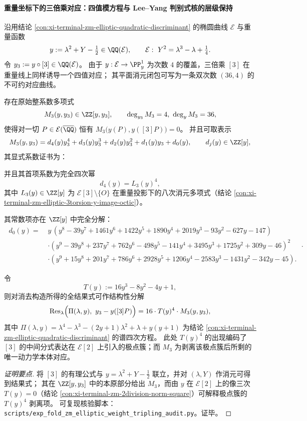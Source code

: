\paragraph{重量坐标下的三倍乘对应：四值模方程与 Lee--Yang 判别式核的层级保持}
沿用结论 \ref{con:xi-terminal-zm-elliptic-quadratic-discriminant} 的椭圆曲线 \(\mathcal{E}\) 与重量函数
\[
y:=\lambda^{2}+Y-\tfrac12\in\QQ(\mathcal{E}),
\qquad
\mathcal{E}:\ Y^{2}=\lambda^{3}-\lambda+\tfrac14.
\]
令 \(y_{3}:=y\circ[3]\in\QQ(\mathcal{E})\)。
由于 \(y:\mathcal{E}\to\PP^{1}_{y}\) 为次数 \(4\) 的覆盖，三倍乘 \([3]\) 在重量线上同样诱导一个四值对应；
其平面消元闭包可写为一条双次数 \((36,4)\) 的不可约对应曲线。

\begin{conclusion}\label{con:xi-terminal-zm-elliptic-weight-tripling-modular-equation}
存在原始整系数多项式
\[
M_{3}(y,y_{3})\in\ZZ[y,y_{3}],
\qquad
\deg_{y_{3}}M_{3}=4,\ \deg_{y}M_{3}=36,
\]
使得对一切 \(P\in\mathcal{E}(\overline{\QQ})\) 恒有 \(M_{3}\bigl(y(P),y([3]P)\bigr)=0\)。
并且可取表示
\[
M_{3}(y,y_{3})=d_{4}(y)y_{3}^{4}+d_{3}(y)y_{3}^{3}+d_{2}(y)y_{3}^{2}+d_{1}(y)y_{3}+d_{0}(y),
\qquad d_{j}(y)\in\ZZ[y],
\]
其显式系数证书为：

\par
并且其首项系数为完全四次幂
\[
d_{4}(y)=L_{3}(y)^{4},
\]
其中 \(L_{3}(y)\in\ZZ[y]\) 为 \(\mathcal{E}[3]\setminus\{O\}\) 在重量投影下的八次消元多项式（结论 \ref{con:xi-terminal-zm-elliptic-3torsion-y-image-octic}）。
\par
其常数项亦在 \(\ZZ[y]\) 中完全分解：
\[
\boxed{\;
\begin{aligned}
d_{0}(y)=\;&y\,(y^{8}-39y^{7}+1461y^{6}+1422y^{5}+1890y^{4}+2019y^{3}-93y^{2}-627y-147)\\
&\cdot (y^{9}-39y^{8}+237y^{7}+762y^{6}-498y^{5}-141y^{4}+3495y^{3}+1725y^{2}+309y-46)^{2}\\
&\cdot (y^{9}+15y^{8}+201y^{7}+786y^{6}+2928y^{5}+1206y^{4}-2583y^{3}-1431y^{2}-342y-45).
\end{aligned}
\; }.
\]
\par
令
\[
T(y):=16y^{3}-8y^{2}-4y+1,
\]
则对消去构造所得的全结果式可作结构性分解
\[
\operatorname{Res}_{\lambda}\Bigl(\Pi(\lambda,y),\ y_{3}-y([3]P)\Bigr)
=16\cdot T(y)^{4}\cdot M_{3}(y,y_{3}),
\]
其中 \(\Pi(\lambda,y)=\lambda^{4}-\lambda^{3}-(2y+1)\lambda^{2}+\lambda+y(y+1)\) 为结论 \ref{con:xi-terminal-zm-elliptic-quadratic-discriminant} 的谱四次方程。
此处 \(T(y)^{4}\) 的出现编码了 \([3]\) 的中间分式表达在 \(\mathcal{E}[2]\) 上引入的极点簇；而 \(M_{3}\) 为剥离该极点簇后所剩的唯一动力学本体对应。
\end{conclusion}
\begin{proof}[证明要点]
将 \([3]\) 的有理公式与 \(y=\lambda^{2}+Y-\tfrac12\) 联立，并对 \((\lambda,Y)\) 作消元可得到结果式；
其在 \(\ZZ[y,y_{3}]\) 中的本原部分给出 \(M_{3}\)，而由 \(y\) 在 \(\mathcal{E}[2]\) 上的像三次 \(T(y)=0\)（结论 \ref{con:xi-terminal-zm-2division-norm-square}）可解释极点簇的 \(T(y)^{4}\) 剥离项。
可复现核验脚本：\texttt{scripts/exp\_fold\_zm\_elliptic\_weight\_tripling\_audit.py}。证毕。
\end{proof}

